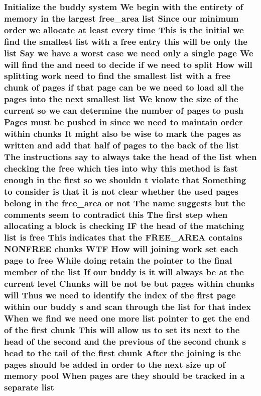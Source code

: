 \subsubsection[{\texorpdfstring{list}{list}}]{\setlength{\rightskip}{0pt plus 5cm}Initialize the buddy system We begin with the entirety of memory {\bf in} the largest {\bf free\+\_\+area} list Since our minimum {\bf order} we allocate at least every time This {\bf is} the initial we find the smallest list with a free entry this will be only the list Say we have a worst case we need only a single {\bf page} We will find the and need to decide if we need to {\bf split} How will splitting work need to find the smallest list with a free {\bf chunk} of {\bf pages} if that {\bf page} can be we need to load all the {\bf pages} into the next smallest list We know the size of the current {\bf so} we can determine the number of {\bf pages} to push Pages must be pushed {\bf in} since we need to maintain {\bf order} within chunks It might also be wise to mark the {\bf pages} as written and add that half of {\bf pages} to the back of the list The instructions say to always take the head of the list when checking the free which ties into why this method {\bf is} fast enough {\bf in} the {\bf first} {\bf so} we shouldn t violate that Something to consider {\bf is} that {\bf it} {\bf is} {\bf not} clear whether the used {\bf pages} belong {\bf in} the {\bf free\+\_\+area} or {\bf not} The name suggests but the comments seem to contradict this The {\bf first} step when allocating a block {\bf is} checking IF the head of the matching list {\bf is} free This indicates that the F\+R\+E\+E\+\_\+\+A\+R\+EA contains N\+O\+N\+F\+R\+EE chunks W\+TF How will joining work set each {\bf page} to free While doing retain the pointer to the final member of the list If our buddy {\bf is} {\bf it} will always be at the current level Chunks will be {\bf not} be but {\bf pages} within chunks will Thus we need to identify the index of the {\bf first} {\bf page} within our buddy s and scan through the list for that index When we find we need one more list pointer to get the end of the {\bf first} {\bf chunk} This will allow us to set its next to the head of the second and the previous of the second {\bf chunk} s head to the tail of the {\bf first} {\bf chunk} After the joining {\bf is} the {\bf pages} should be added {\bf in} {\bf order} to the next size up of memory pool When {\bf pages} are they should be tracked {\bf in} a separate list}\hypertarget{notes_8txt_a4ee6db26bad3dd738a9a0384595fe358}{}\label{notes_8txt_a4ee6db26bad3dd738a9a0384595fe358}


